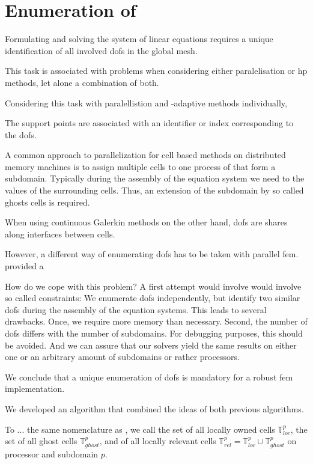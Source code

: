 \section{Enumeration of }
\label{sec:enumeration}

Formulating and solving the system of linear equations requires a unique identification of all involved \glspl{dof} in the global mesh.

This task is associated with problems when considering either paralelisation or hp methods, let alone a combination of both.

Considering this task with paralellistion and \hp-adaptive methods individually, 


The support points are associated with an identifier or index corresponding to the \glspl{dof}.



A common approach to parallelization for cell based methods on distributed memory machines is to assign multiple cells to one process of that form a subdomain. Typically during the assembly of the equation system we need to the values of the surrounding cells. Thus, an extension of the subdomain by so called ghosts cells is required.


When using continuous Galerkin methods on the other hand, \glspl{dof} are shares along interfaces between cells.


However, a different way of enumerating \glspl{dof} has to be taken with parallel \gls{fem}. \textcite{bangerth2012} provided a 


How do we cope with this problem? A first attempt would involve would involve so called constraints: We enumerate \glspl{dof} independently, but identify two similar \glspl{dof} during the assembly of the equation systems. This leads to several drawbacks. Once, we require more memory than necessary. Second, the number of \glspl{dof} differs with the number of subdomains. For debugging purposes, this should be avoided. And we can assure that our solvers yield the same results on either one or an arbitrary amount of subdomains or rather processors.

We conclude that a unique enumeration of \glspl{dof} is mandatory for a robust \gls{fem} implementation.

We developed an algorithm that combined the ideas of both previous algorithms.

To ... the same nomenclature as \cite{bangerth2012}, we call the set of all locally owned cells $\mathbb{T}^p_{loc}$, the set of all ghost cells $\mathbb{T}^p_{ghost}$, and of all locally relevant cells $\mathbb{T}^p_{rel} = \mathbb{T}^p_{loc} \cup \mathbb{T}^p_{ghost}$ on processor and subdomain $p$.

